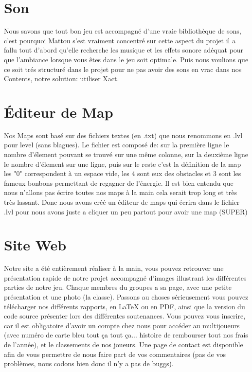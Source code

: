\documentclass [11pt]{report}
\begin{document}
	\section{Son}
	Nous savons que tout bon jeu est accompagné d'une vraie bibliothèque de sons, c'est pourquoi Mattou s'est vraiment concentré sur cette aspect du projet il a fallu tout d'abord qu'elle recherche les musique et les effets sonore adéquat pour que l'ambiance lorsque vous êtes dans le jeu soit optimale. Puis nous voulions que ce soit trés structuré dans le projet pour ne pas avoir des sons en vrac dans nos Contents, notre solution: utiliser Xact. 
	
	\newpage
	\section{\'Editeur de Map}
	Nos Maps sont basé sur des fichiers textes (en .txt) que nous renommons en .lvl pour level (sans blagues). Le fichier est composé de: sur la première ligne le nombre d'élement pouvant se trouvé sur une même colonne, sur la deuxième ligne le nombre d'élement sur une ligne, puis sur le reste c'est la définition de la map %
	les "0" correspondent à un espace vide, les 4 sont eux des obstacles et 3 sont les fameux bonbons permettant de regagner de l'énergie.
	\indent Il est bien entendu que nous n'allons pas écrire toutes nos maps à la main cela serait trop long et très très lassant. Donc nous avons créé un éditeur de maps qui écrira dans le fichier .lvl pour nous avons juste a cliquer un peu partout pour avoir une map (SUPER) %
	 
	\section{Site Web}
	Notre site a été entièrement réaliser à la main, vous pouvez retrouver une présentation rapide de notre projet accompagné d'images illustrant les différentes parties de notre jeu. Chaque membres du groupes a sa page, avec une petite présentation et une photo (la classe). Passons au choses sérieusement vous pouvez télécharger nos différents rapports, en LaTeX ou en PDF, ainsi que la version du code source présenter lors des différentes soutenances. Vous pouvez vous inscrire, car il est obligatoire d'avoir un compte chez nous pour accéder au multijoueurs (avec numéro de carte bleu tout ça tout ça... histoire de rembourser tout nos frais de l'année), et le classements de nos joueurs. Une page de contact est disponible afin de vous permettre de nous faire part de vos commentaires (pas de vos problèmes, nous codons bien donc il n'y a pas de buggs).
\end{document}
